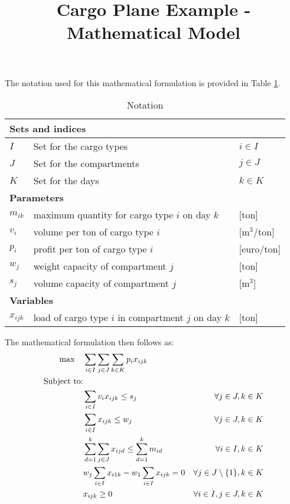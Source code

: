 \documentclass[11pt,a4paper]{article}
\begin{document}
\title{\Large{Cargo Plane Example - Mathematical Model }}
\date{}
\maketitle
\vspace{-0.5cm}
The notation used for this mathematical formulation is provided in Table \ref{tab:notation}. \vspace{-0.5cm} 
\begin{table}[h]
\caption{Notation} 
\centering
\label{tab:notation}
\begin{tabular}{lll}
\toprule
\multicolumn{3}{l}{\textbf{Sets and indices}} \\
\midrule							
$I$     & Set for the cargo types & $i \in I$  \\
$J$     & Set for the compartments & $j \in J$ \\
$K$     & Set for the days & $k \in K$ \\
\midrule
\multicolumn{3}{l}{\textbf{Parameters}}   \\
\midrule
$m_{ik}$     & maximum quantity for cargo type $i$ on day $k$ & [ton] \\
$v_i$        & volume per ton of cargo type $i$ & [m$^3$/ton] \\
$p_i$        & profit per ton of cargo type $i$ & [euro/ton] \\
$w_j$        & weight capacity of compartment $j$ & [ton] \\
$s_j$        & volume capacity of compartment $j$ & [m$^3$] \\
\midrule
\multicolumn{3}{l}{\textbf{Variables}}    \\ 
\midrule
$x_{ijk}$    & load of cargo type $i$ in compartment $j$ on day $k$ & [ton]  \\
\bottomrule 
\end{tabular}
\end{table}

The mathematical formulation then follows as: 
\begin{align}
\max \quad & \sum_{i \in I} \sum_{j \in J} \sum_{k \in K} p_i x_{ijk}\label{obj} &\\
\notag
\text{Subject to:} & &\\
& \sum_{i \in I} v_i x_{ijk} \leq s_j &\forall j \in J, k \in K \label{volume_cons} \\
& \sum_{i \in I} x_{ijk} \leq w_j &\forall j \in J, k \in K \label{weight_cons} \\
& \sum_{d=1}^k \sum_{j \in J} x_{ijd} \leq \sum_{d=1}^k m_{id} &\forall i \in I, k \in K \label{cargo_cons} \\
& w_j \sum_{i \in I} x_{i1k} - w_1 \sum_{i \in I} x_{ijk} = 0 &\forall j \in J \setminus{\{1\}} , k \in K \label{balance_cons} \\
& x_{ijk} \geq 0 & \forall i \in I, j \in J, k \in K 
\end{align}
\end{document}
